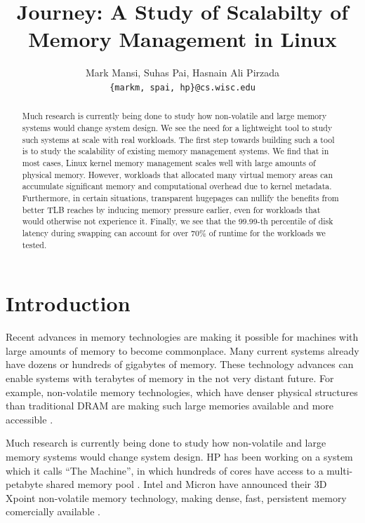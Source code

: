 \documentclass[twocolumn,11pt]{article}
\title{Journey: A Study of Scalabilty of Memory Management in Linux}
\author{Mark Mansi, Suhas Pai, Hasnain Ali Pirzada\\\texttt{\{markm, spai, hp\}@cs.wisc.edu}}
\date{}
\begin{document}
\maketitle

\begin{abstract}
    \small 

Much research is currently being done to study how non-volatile and large memory
    systems would change system design.  We see the need for a lightweight tool
    to study such systems at scale with real workloads.  The first step towards
    building such a tool is to study the scalability of existing memory
    management systems. 
We find that in most cases, Linux kernel memory management scales well with
    large amounts of physical memory. However, workloads that allocated many
    virtual memory areas can accumulate significant memory and computational
    overhead due to kernel metadata.     
    Furthermore, in certain situations, transparent hugepages can nullify the
    benefits from better TLB reaches by inducing memory pressure earlier, even
    for workloads that would otherwise not experience it.
Finally, we see that the 99.99-th percentile of disk latency during swapping
    can account for over 70\% of runtime for the workloads we tested.

\end{abstract}

\section{Introduction}

Recent advances in memory technologies are making it possible for machines with
large amounts of memory to become commonplace. Many current systems already
have dozens or hundreds of gigabytes of memory. These technology advances can
enable systems with terabytes of memory in the not very distant future. For
example, non-volatile memory technologies, which have denser physical
structures than traditional DRAM are making such large memories available and
more accessible \cite{xpoint}.

Much research is currently being done to study how non-volatile and large
memory systems would change system design. HP has been working on a system
which it calls ``The Machine'', in which hundreds of cores have access to a
multi-petabyte shared memory pool \cite{hp_machine}. Intel and
Micron have announced their 3D Xpoint non-volatile memory technology, making
dense, fast, persistent memory comercially available \cite{xpoint}.
\end{document}
